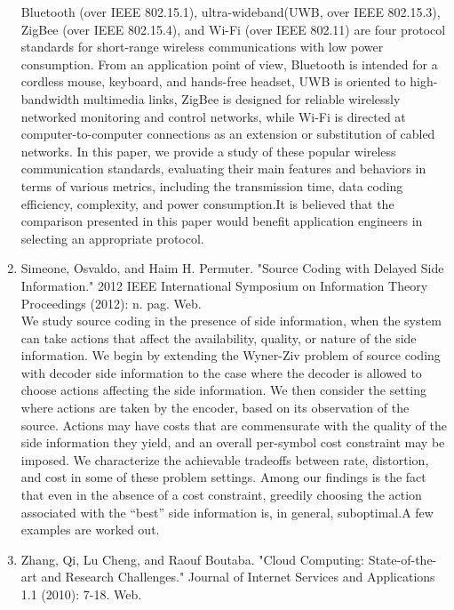 \documentclass[oneside,a4paper,12pt]{report}
\begin{document}
\begin{enumerate}
Bluetooth (over IEEE 802.15.1), ultra-wideband(UWB, over IEEE 802.15.3), ZigBee (over IEEE 802.15.4), and Wi-Fi (over IEEE 802.11) are four protocol standards for short-range wireless communications with low power consumption. From an application point of view, Bluetooth is intended for a cordless mouse, keyboard, and hands-free headset, UWB is oriented to high-bandwidth multimedia links, ZigBee is designed for reliable wirelessly networked monitoring and control networks, while Wi-Fi is directed at computer-to-computer connections as an extension or substitution of cabled networks. In this paper, we provide a study of these popular wireless communication standards, evaluating their main features and behaviors in terms of various metrics, including the transmission time, data coding efficiency, complexity, and power consumption.It is believed that the comparison presented in this paper would benefit application engineers in selecting an appropriate protocol.\\
\item Simeone, Osvaldo, and Haim H. Permuter. "Source Coding with Delayed Side Information." 2012 IEEE International Symposium on Information Theory Proceedings (2012): n. pag. Web.\\
We study source coding in the presence of side information, when the system can take actions that affect the availability, quality, or nature of the side information. We begin by extending the Wyner-Ziv problem of source coding with decoder side information to the case where the decoder is allowed to choose actions affecting the side information. We then consider the setting where actions are taken by the encoder, based on its observation of the source. Actions may have costs that are commensurate with the quality of the side information they yield, and an overall per-symbol cost constraint may be imposed. We characterize the achievable tradeoffs between rate, distortion, and cost in some of these problem settings. Among our findings is the fact that even in the absence of a cost constraint, greedily choosing the action associated with the “best” side information is, in general, suboptimal.A few examples are worked out.\\
\item Zhang, Qi, Lu Cheng, and Raouf Boutaba. "Cloud Computing: State-of-the-art and Research Challenges." Journal of Internet Services and Applications 1.1 (2010): 7-18. Web.\\

\end{enumerate}
\end{document}
